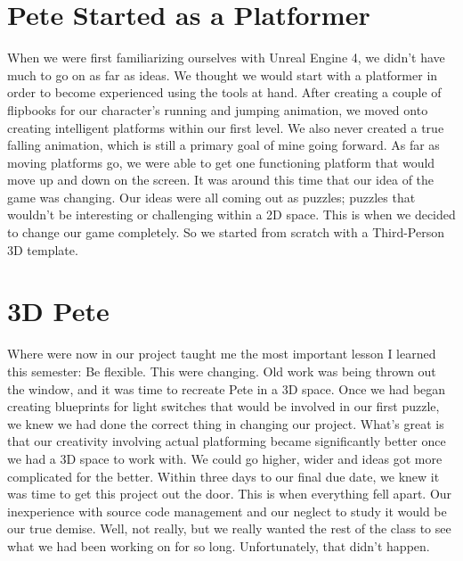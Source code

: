 \documentclass[]{article}
\begin{document}
\section{Pete Started as a Platformer}
	When  we were first familiarizing ourselves with Unreal Engine 4, we didn't have much to go on as far as ideas. We thought we would start with a platformer in order to become experienced using the tools at hand. After creating a couple of flipbooks for our character's running and jumping animation, we moved onto creating intelligent platforms within our first level. We also never created a true falling animation, which is still a primary goal of mine going forward. As far as moving platforms go, we were able to get one functioning platform that would move up and down on the screen. It was around this time that our idea of the game was changing. Our ideas were all coming out as puzzles; puzzles that wouldn't be interesting or challenging within a 2D space. This is when we decided to change our game completely. So we started from scratch with a Third-Person 3D template. 
	
\section{3D Pete}
	Where were now in our project taught me the most important lesson I learned this semester: Be flexible. This were changing. Old work was being thrown out the window, and it was time to recreate Pete in a 3D space. Once we had began creating blueprints for light switches that would be involved in our first puzzle, we knew we had done the correct thing in changing our project. What's great is that our creativity involving actual platforming became significantly better once we had a 3D space to work with. We could go higher, wider and ideas got more complicated for the better. Within three days to our final due date, we knew it was time to get this project out the door. This is when everything fell apart. Our inexperience with source code management and our neglect to study it would be our true demise. Well, not really, but we really wanted the rest of the class to see what we had been working on for so long. Unfortunately, that didn't happen.   
\end{document}
